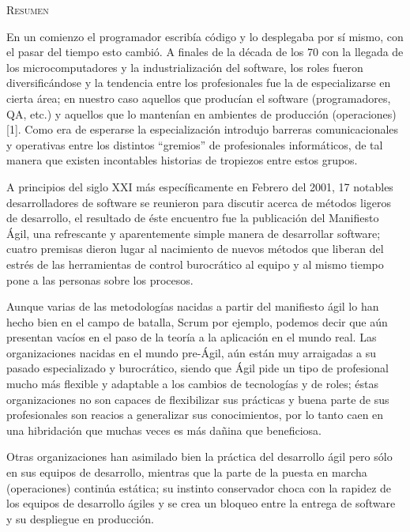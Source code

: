 \documentclass[conference]{IEEEtran}
\begin{document}

\noindent
\begin{minipage}{0.9\textwidth}
 \textsc{Resumen}
\end{minipage}

En un comienzo el programador escribía código y lo desplegaba por sí mismo, con el pasar del tiempo esto cambió. A finales de la década de los 70 con la llegada de los microcomputadores y la industrialización del software, los roles fueron diversificándose y la tendencia entre los profesionales fue la de especializarse en cierta área; en nuestro caso aquellos que producían el software (programadores, QA, etc.) y aquellos que lo mantenían en ambientes de producción (operaciones) [1]. Como era de esperarse la especialización introdujo barreras comunicacionales y operativas entre los distintos “gremios” de profesionales informáticos, de tal manera que existen incontables historias de tropiezos entre estos grupos. 

A principios del siglo XXI más específicamente en Febrero del 2001, 17 notables desarrolladores de software se reunieron para discutir acerca de métodos ligeros de desarrollo, el resultado de éste encuentro fue la publicación del Manifiesto Ágil, una refrescante y aparentemente simple manera de desarrollar software; cuatro premisas dieron lugar al nacimiento de nuevos métodos que liberan del estrés de las herramientas de control burocrático al equipo y al mismo tiempo pone a las personas sobre los procesos. 

Aunque varias de las metodologías nacidas a partir del manifiesto ágil lo han hecho bien en el campo de batalla, Scrum por ejemplo, podemos decir que aún presentan vacíos en el paso de la teoría a la aplicación en el mundo real. Las organizaciones nacidas en el mundo pre-Ágil, aún están muy arraigadas a su pasado especializado y burocrático, siendo que Ágil pide un tipo de profesional mucho más flexible y adaptable a los cambios de tecnologías y de roles; éstas organizaciones no son capaces de flexibilizar sus prácticas y buena parte de sus profesionales son reacios a generalizar sus conocimientos, por lo tanto caen en una hibridación que muchas veces es más dañina que beneficiosa. 

Otras organizaciones han asimilado bien la práctica del desarrollo ágil pero sólo en sus equipos de desarrollo, mientras que la parte de la puesta en marcha (operaciones) continúa estática; su instinto conservador choca con la rapidez de los equipos de desarrollo ágiles y se crea un bloqueo entre la entrega de software y su despliegue en producción.
\end{document}
